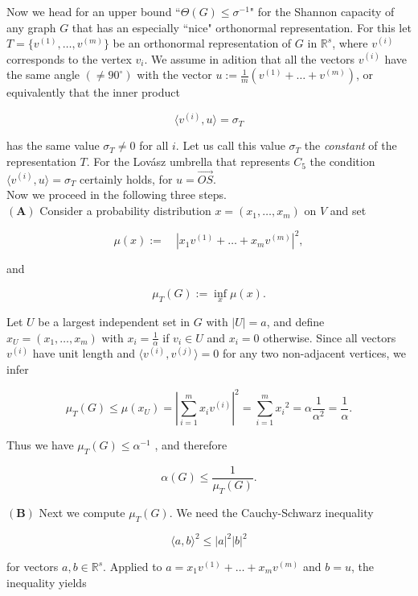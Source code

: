 \documentclass[openany,12pt]{memoir}
\newcommand{\setnewpagemargins}{
    \clearpage
    \setulmarginsandblock{2cm}{0.5cm}{*}
    \checkandfixthelayout
}
\begin{document}

\setnewpagemargins

Now we head for an upper bound ``$\Theta(G) \leq \sigma^{-1}$" for the Shannon capacity
of any graph $G$ that has an especially ``nice" orthonormal representation.
For this let $T = \{v^{(1)},\ldots,v^{(m)}\}$ be an orthonormal representation 
of $G$ in $\mathbb{R}^{s}$, where $v^{(i)}$ corresponds to the vertex $v_i$. We assume in
adition that all the vectors $v^{(i)}$ have the same angle $(\neq 90^{\circ})$ with the
vector $u := {\frac{1}{m}}(v^{(1)}+\ldots+v^{(m)})$, or equivalently that the inner product 

\[
 \langle v^{(i)}, u\rangle  = \sigma _T
\]

has the same value $\sigma_T \neq 0$ for all $i$. Let us call this value $\sigma_T$ the \textit{constant}
of the representation $T$. For the Lov\'asz umbrella that represents $C_5$ the 
condition $\langle v^{(i)},u \rangle = \sigma_T$ certainly holds, for $u = \overset{\rightarrow}{OS}$.\\
Now we proceed in the following three steps.\\
$\mathbf{(A)}$ Consider a probability distribution $x = (x_1,\ldots, x_m)$ on $V$ and set

\[
\mu(x) := \quad |x_1v^{(1)}+\ldots+x_mv^{(m)}|^{2},
\]

and

\[
{\mu_{T}}(G) := \underset{x}{\inf}\mu(x).
\]

Let $U$ be a largest independent set in $G$ with $|U| = a$, and define
$x_U = (x_1,\ldots,x_m)$ with $x_i = {\frac{1}{\alpha}}$ if $v_i\in U$ and $x_i = 0$  otherwise. Since all 
vectors $v^{(i)}$  have unit length and $\langle v^{(i)}, v^{(j)} \rangle = 0$ for any two non-adjacent 
vertices, we infer

\[
    \mu_T(G)\leq\mu(x_U)=|\sum_{i=1}^{m}x_iv^{(i)}|^2= \sum_{i=1}^{m} {x_i}^2 = \alpha {\frac{1}{\alpha^{2}}} = {\frac{1}{\alpha}}.
\]

Thus we have $\mu_{T}(G) \leq \alpha^{-1}$ , and therefore

\[
    \alpha(G) \leq {\frac{1}{\mu_{T}(G)}}.
\]

$\mathbf{(B)}$ Next we compute ${\mu_T}(G)$. We need the Cauchy-Schwarz inequality

\[
\langle a,b \rangle^2 \leq |a|^2 |b|^2
\]

for vectors $a,b \in \mathbb{R}^s$. Applied to $a = x_{1}v^{(1)}+\ldots+x_{m}v^{(m)}$ and $b=u$,
the inequality yields
\end{document}
